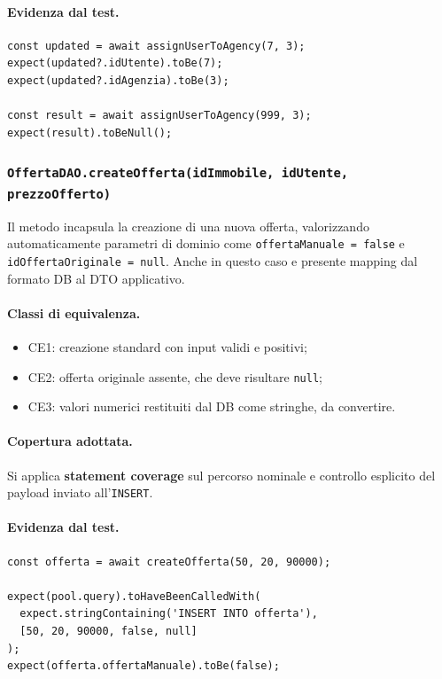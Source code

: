 \documentclass[a4paper,11pt]{article}
\begin{document}
\paragraph{Evidenza dal test.}
\begin{lstlisting}[style=projectcode]
const updated = await assignUserToAgency(7, 3);
expect(updated?.idUtente).toBe(7);
expect(updated?.idAgenzia).toBe(3);

const result = await assignUserToAgency(999, 3);
expect(result).toBeNull();
\end{lstlisting}

\subsubsection{\texttt{OffertaDAO.createOfferta(idImmobile, idUtente, prezzoOfferto)}}
Il metodo incapsula la creazione di una nuova offerta, valorizzando automaticamente parametri di dominio come \texttt{offertaManuale = false} e \texttt{idOffertaOriginale = null}. Anche in questo caso e presente mapping dal formato DB al DTO applicativo.

\paragraph{Classi di equivalenza.}
\begin{itemize}
  \item CE1: creazione standard con input validi e positivi;
  \item CE2: offerta originale assente, che deve risultare \texttt{null};
  \item CE3: valori numerici restituiti dal DB come stringhe, da convertire.
\end{itemize}

\paragraph{Copertura adottata.}
Si applica \textbf{statement coverage} sul percorso nominale e controllo esplicito del payload inviato all'\texttt{INSERT}.

\paragraph{Evidenza dal test.}
\begin{lstlisting}[style=projectcode]
const offerta = await createOfferta(50, 20, 90000);

expect(pool.query).toHaveBeenCalledWith(
  expect.stringContaining('INSERT INTO offerta'),
  [50, 20, 90000, false, null]
);
expect(offerta.offertaManuale).toBe(false);
\end{lstlisting}
\end{document}
